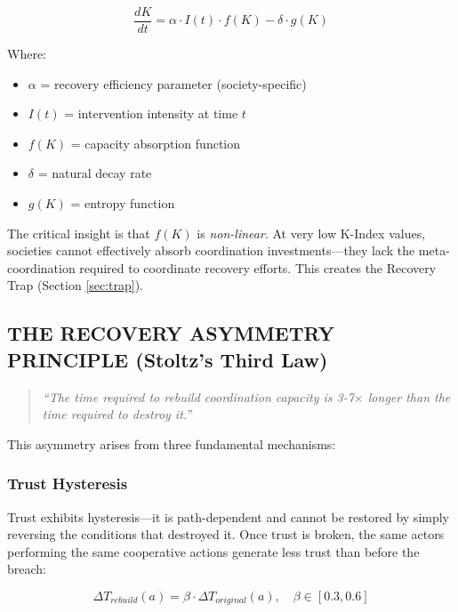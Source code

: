 \documentclass[11pt,letterpaper]{article}
\newcommand{\kindex}{K}
\begin{document}
\begin{equation}
\frac{d\kindex}{dt} = \alpha \cdot I(t) \cdot f(\kindex) - \delta \cdot g(\kindex)
\label{eq:recovery_dynamics}
\end{equation}

Where:
\begin{itemize}
\item $\alpha$ = recovery efficiency parameter (society-specific)
\item $I(t)$ = intervention intensity at time $t$
\item $f(\kindex)$ = capacity absorption function
\item $\delta$ = natural decay rate
\item $g(\kindex)$ = entropy function
\end{itemize}

The critical insight is that $f(\kindex)$ is \emph{non-linear}. At very low K-Index values, societies cannot effectively absorb coordination investments---they lack the meta-coordination required to coordinate recovery efforts. This creates the Recovery Trap (Section \ref{sec:trap}).

\subsection{THE RECOVERY ASYMMETRY PRINCIPLE (Stoltz's Third Law)}

\begin{quote}
\textit{``The time required to rebuild coordination capacity is 3-7$\times$ longer than the time required to destroy it.''}
\end{quote}

This asymmetry arises from three fundamental mechanisms:

\subsubsection{Trust Hysteresis}

Trust exhibits hysteresis---it is path-dependent and cannot be restored by simply reversing the conditions that destroyed it. Once trust is broken, the same actors performing the same cooperative actions generate less trust than before the breach:

\begin{equation}
\Delta T_{rebuild}(a) = \beta \cdot \Delta T_{original}(a), \quad \beta \in [0.3, 0.6]
\label{eq:trust_hysteresis}
\end{equation}
\end{document}
